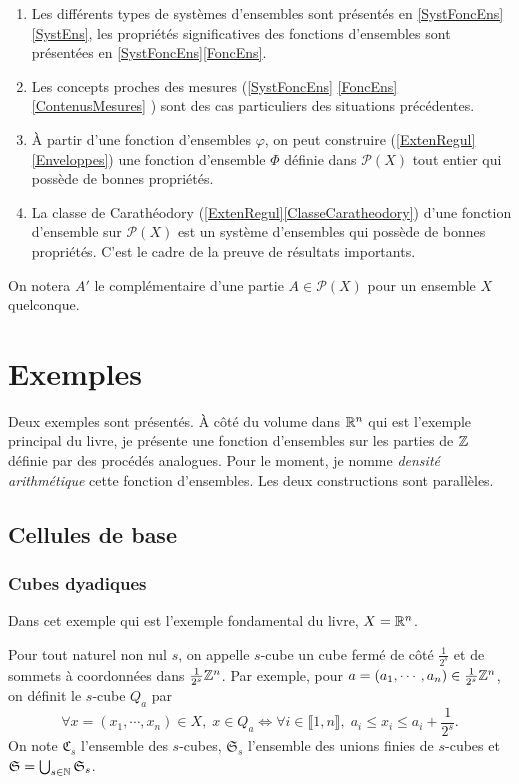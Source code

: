 \begin{enumerate}
 \item  Les différents types de systèmes d'ensembles sont présentés en \ref{SystFoncEns}\ref{SystEns}, les propriétés significatives des fonctions d'ensembles sont présentées en \ref{SystFoncEns}\ref{FoncEns}.
 \item Les concepts proches des mesures (\ref{SystFoncEns} \ref{FoncEns} \ref{ContenusMesures} ) sont des cas particuliers des situations précédentes.
 \item À partir d'une fonction d'ensembles $\varphi$, on peut construire (\ref{ExtenRegul} \ref{Enveloppes}) une fonction d'ensemble $\Phi$ définie dans $\mathcal{P}(X)$ tout entier qui possède de bonnes propriétés.
 \item La classe de Carathéodory (\ref{ExtenRegul}\ref{ClasseCaratheodory}) d'une fonction d'ensemble sur $\mathcal{P}(X)$ est un système d'ensembles qui possède de bonnes propriétés. C'est le cadre de la preuve de résultats importants.
\end{enumerate}

On notera $A'$ le complémentaire d'une partie $A \in \mathcal{P}(X)$ pour un ensemble $X$ quelconque.
\newpage

\section{Exemples}\label{Exples}
Deux exemples sont présentés. À côté du volume dans $\mathbb{R}^n$ qui est l'exemple principal du livre, je présente une fonction d'ensembles sur les parties de $\mathbb{Z}$ définie par des procédés analogues. Pour le moment, je nomme \emph{densité arithmétique} cette fonction d'ensembles. Les deux constructions sont parallèles.

\subsection{Cellules de base}

\subsubsection{Cubes dyadiques}
Dans cet exemple qui est l'exemple fondamental du livre, $X=\mathbb{R}^n$.
\begin{defi}[s-cube]\label{s-cube}
Pour tout naturel non nul $s$, on appelle $s$-cube un cube fermé de côté $\frac{1}{2^s}$ et de sommets à coordonnées dans $\frac{1}{2^s}\mathbb{Z}^n$.\newline
Par exemple, pour $a = (a_1, \cdots, a_n) \in \frac{1}{2^s}\mathbb{Z}^n$, on définit le $s$-cube $Q_a$ par
\begin{displaymath}
 \forall x = (x_1, \cdots, x_n) \in X, \; x \in Q_a  \Leftrightarrow \forall i \in \llbracket 1,n \rrbracket,\; a_i \leq x_i \leq a_i + \frac{1}{2^s}.
\end{displaymath}
On note $\mathfrak{C}_s$ l'ensemble des $s$-cubes, $\mathfrak{S}_s$ l'ensemble des unions finies de $s$-cubes et $\mathfrak{S} = \bigcup_{s\in \mathbb{N}} \mathfrak{S}_s$.
\end{defi}

